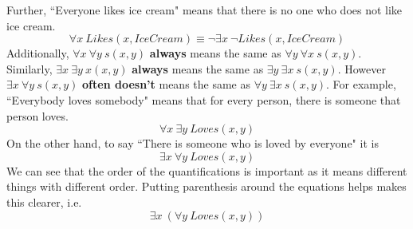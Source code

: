 \documentclass{article}
\begin{document}
Further, ``Everyone likes ice cream" means that there is no one who does not like ice cream.
\begin{equation}
\forall x\ Likes(x, IceCream) \equiv \neg \exists x\ \neg Likes(x, IceCream)
\end{equation}
Additionally, $\forall x\ \forall y\ s(x, y)$ \textbf{always} means the same as $\forall y\ \forall x\ s(x, y)$. Similarly, $\exists x\ \exists y\ x(x, y)$ \textbf{always} means the same as $\exists y\ \exists x\ s(x, y)$. However $\exists x\ \forall y\ s(x, y)$ \textbf{often doesn't} means the same as $\forall y\ \exists x\ s(x, y)$. For example, ``Everybody loves somebody" means that for every person, there is someone that person loves.
\begin{equation}
\forall x\ \exists y\ Loves(x, y)
\end{equation}
On the other hand, to say ``There is someone who is loved by everyone" it is
\begin{equation}
\exists x\ \forall y\ Loves(x, y)
\end{equation}
We can see that the order of the quantifications is important as it means different things with different order. Putting parenthesis around the equations helps makes this clearer, i.e.
\begin{equation}
\exists x\ (\forall y\ Loves (x, y))
\end{equation}
\end{document}
